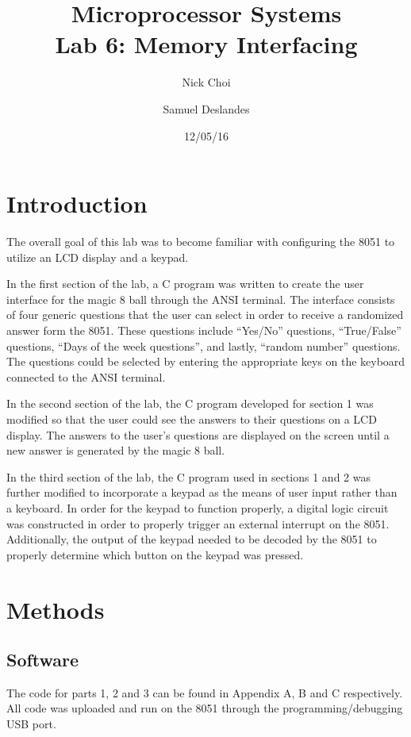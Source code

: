 \documentclass[12pt]{article}
\begin{document}
\title{Microprocessor Systems\\ Lab 6: Memory Interfacing }
\author{Nick Choi \and Samuel Deslandes}
\date{12/05/16}
\maketitle
\pagebreak
\section{Introduction}
The overall goal of this lab was to become familiar with configuring the 8051 to utilize an LCD display and a keypad. 

In the first section of the lab, a C program was written to create the user interface for the magic 8 ball through the ANSI terminal. The interface consists of four generic questions that the user can select in order to receive a randomized answer form the 8051. These questions include “Yes/No” questions, “True/False” questions, “Days of the week questions”, and lastly, “random number” questions. The questions could be selected by entering the appropriate keys on the keyboard connected to the ANSI terminal.  

In the second section of the lab, the C program developed for section 1 was modified so that the user could see the answers to their questions on a LCD display. The answers to the user’s questions are displayed on the screen until a new answer is generated by the magic 8 ball. 

In the third section of the lab, the C program used in sections 1 and 2 was further modified to incorporate a keypad as the means of user input rather than a keyboard. In order for the keypad to function properly, a digital logic circuit was constructed in order to properly trigger an external interrupt on the 8051. Additionally, the output of the keypad needed to be decoded by the 8051 to properly determine which button on the keypad was pressed. 


\section{Methods}
\subsection{Software}
The code for parts 1, 2 and 3 can be found in Appendix A, B and C respectively. All code was uploaded and run on the 8051 through the programming/debugging USB port. 
\end{document}
